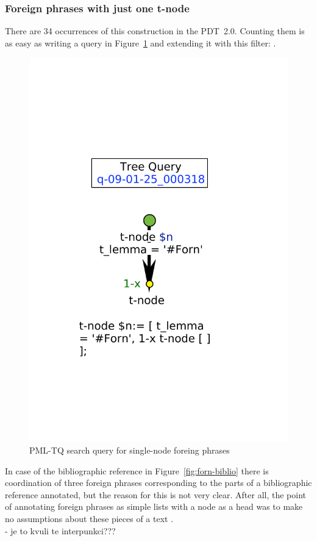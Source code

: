 \subsubsection{Foreign phrases with just one t-node}
There are 34 occurrences of this construction in the PDT~2.0. Counting them is as easy as writing a query in Figure~\ref{fig:tq-forn1} and extending it with this filter: .

\begin{figure}
\includegraphics[width=0.3 \textwidth]{images/vyhledavky/query-forn-1-x.pdf}
\caption{PML-TQ search query for single-node foreing phrases}
\label{fig:tq-forn1}
\end{figure}

In case of the bibliographic reference in Figure~\ref{fig:forn-biblio} there is coordination of three foreign phrases corresponding to the parts of a bibliographic reference annotated, but the reason for this is not very clear. After all, the point of annotating foreign phrases as simple lists with a  node as a head was to make no assumptions about these pieces of a text \pageref{pdt-t-man:300}.  \\
- je to kvuli te interpunkci???

